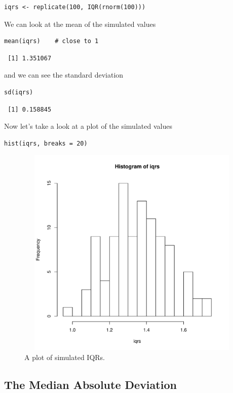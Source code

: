 \documentclass[captions=tableheading]{scrbook}
\begin{document}
\begin{verbatim}
iqrs <- replicate(100, IQR(rnorm(100)))
\end{verbatim}

We can look at the mean of the simulated values

\begin{verbatim}
mean(iqrs)    # close to 1
\end{verbatim}

\begin{verbatim}
 [1] 1.351067
\end{verbatim}

and we can see the standard deviation

\begin{verbatim}
sd(iqrs)
\end{verbatim}

\begin{verbatim}
 [1] 0.158845
\end{verbatim}

Now let's take a look at a plot of the simulated values


\begin{verbatim}
hist(iqrs, breaks = 20)
\end{verbatim}



\begin{figure}[th]
    \includegraphics[width=5in, height=4in]{img/simulated-IQR.pdf}
    \caption[Plot of simulated IQRs]{\small A plot of simulated IQRs.}
    \label{fig:simulated-IQR}
  \end{figure}
\subsection{The Median Absolute Deviation}
\label{sec-8-5-2}
\end{document}
